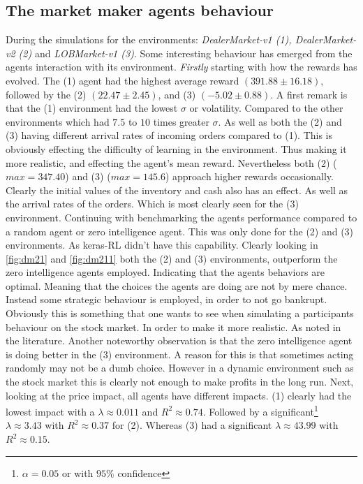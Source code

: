 \documentclass{kththesis}
\theoremstyle{definition}
\begin{document}
\subsection*{The market maker agents behaviour}
During the simulations for the environments:
\newline
\textit{DealerMarket-v1 (1), DealerMarket-v2 (2)} and \textit{LOBMarket-v1 (3)}. Some interesting behaviour has emerged from the agents interaction with its environment. \textit{Firstly} starting with how the rewards has evolved. The (1) agent had the highest average reward $(391.88 \pm 16.18)$, followed by the (2) $(22.47 \pm2.45)$, and (3) $(-5.02 \pm 0.88)$.  A first remark is that the (1) environment had the lowest $\sigma$ or volatility. Compared to the other environments which had $7.5$ to $10$ times greater $\sigma$. As well as both the (2) and (3) having different arrival rates of incoming orders compared to (1). This is obviously effecting the difficulty of learning in the environment. Thus making it more realistic, and effecting the agent's mean reward. Nevertheless both (2) ($max = 347.40$) and (3) ($max=145.6$) approach higher rewards occasionally. Clearly the initial values of the inventory and cash also has an effect. As well as the arrival rates of the orders. Which is most clearly seen for the (3) environment. 
\newline
\newline
Continuing with benchmarking the agents performance compared to a random agent or zero intelligence agent. This was only done for the (2) and (3) environments. As keras-RL didn't have this capability. Clearly looking in \autoref{fig:dm21} and \autoref{fig:dm211} both the (2) and (3) environments, outperform the zero intelligence agents employed. Indicating that the agents behaviors are optimal. Meaning that the choices the agents are doing are not by mere chance. Instead some strategic behaviour is employed, in order to not go bankrupt. Obviously this is something that one wants to see when simulating a participants behaviour on the stock market. In order to make it more realistic. As noted in the literature. Another noteworthy observation is that the zero intelligence agent is doing better in the (3) environment.
\newline
\newline
 A reason for this is that sometimes acting randomly may not be a dumb choice. However in a dynamic environment such as the stock market this is clearly not enough to make profits in the long run. Next, looking at the price impact, all agents have different impacts. (1) clearly had the lowest impact with a $\lambda \approx 0.011$ and $R^{2} \approx 0.74$. Followed by a significant\footnote{$\alpha = 0.05$ or with $95\%$ confidence} $\lambda \approx 3.43$ with $R^{2} \approx 0.37 $ for (2). Whereas (3) had a significant $\lambda \approx 43.99$ with $R^{2} \approx 0.15$. 
 
\end{document}
